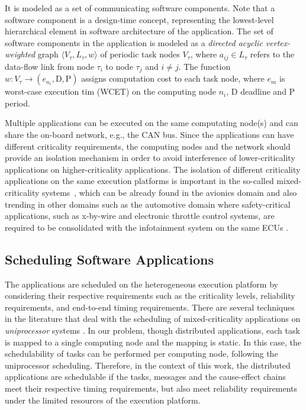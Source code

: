 \begin{definition}\label{def_application}
It is modeled as a set of communicating software components. Note that a software component is a design-time concept, representing the lowest-level hierarchical element in software architecture of the application. The set of software components in the application is modeled as a \textit{directed acyclic vertex-weighted} graph $\langle V_\tau,L_\tau, w\rangle$ of periodic task nodes $V_\tau$, where $a_{ij}\in L_\tau$ refers to the data-flow link from node $\tau_i$ to node $\tau_j$ and $i \neq j$. The function $w: V_\tau\rightarrow (e_{n_i},\mathrm{D,P})$ assigns computation cost to each task node, where  $e_m$ is worst-case execution tim (WCET) on the computing node $n_i$, D deadline and P period.
\end{definition}

Multiple applications can be executed on the same computating node(s) and can share the on-board network, e.g., the CAN bus. Since the applications can have different criticality requirements, the computing nodes and the network should provide an isolation mechanism in order to avoid interference of lower-criticality applications on higher-criticality applications. The isolation of different criticality applications on the same execution platforms is important in the so-called mixed-criticality systems~\cite{Vestal2007PreemptiveAssurance}, which can be already found in the avionics domain and also trending in other domains such as the automotive domain where safety-critical applications, such as x-by-wire and electronic throttle control systems, are required to be consolidated with the infotainment system on the same ECUs \cite{bibid}.

\subsection{Scheduling Software Applications}
The applications are scheduled on the heterogeneous execution platform by considering their respective requirements such as the criticality levels, reliability requirements, and end-to-end timing requirements. There are several techniques in the literature that deal with the scheduling of mixed-criticality applications on \textit{uniprocessor} systems \cite{Vestal2007PreemptiveAssurance}. In our problem, though distributed applications, each task is mapped to a single computing node and the mapping is static. In this case, the schedulability of tasks can be performed per computing node, following the uniprocessor scheduling. Therefore, in the context of this work, the distributed applications are schedulable if the tasks, messages and the cause-effect chains meet their respective timing requirements, but also meet reliability requirements under the limited resources of the execution platform.

